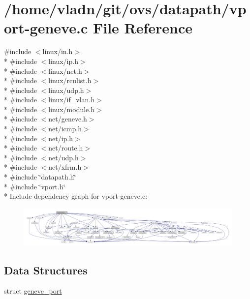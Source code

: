 \hypertarget{vport-geneve_8c}{}\section{/home/vladn/git/ovs/datapath/vport-\/geneve.c File Reference}
\label{vport-geneve_8c}
{\ttfamily \#include $<$linux/in.\+h$>$}\\*
{\ttfamily \#include $<$linux/ip.\+h$>$}\\*
{\ttfamily \#include $<$linux/net.\+h$>$}\\*
{\ttfamily \#include $<$linux/rculist.\+h$>$}\\*
{\ttfamily \#include $<$linux/udp.\+h$>$}\\*
{\ttfamily \#include $<$linux/if\+\_\+vlan.\+h$>$}\\*
{\ttfamily \#include $<$linux/module.\+h$>$}\\*
{\ttfamily \#include $<$net/geneve.\+h$>$}\\*
{\ttfamily \#include $<$net/icmp.\+h$>$}\\*
{\ttfamily \#include $<$net/ip.\+h$>$}\\*
{\ttfamily \#include $<$net/route.\+h$>$}\\*
{\ttfamily \#include $<$net/udp.\+h$>$}\\*
{\ttfamily \#include $<$net/xfrm.\+h$>$}\\*
{\ttfamily \#include \char`\"{}datapath.\+h\char`\"{}}\\*
{\ttfamily \#include \char`\"{}vport.\+h\char`\"{}}\\*
Include dependency graph for vport-\/geneve.c\+:
\nopagebreak
\begin{figure}[H]
\begin{center}
\leavevmode
\includegraphics[width=350pt]{vport-geneve_8c__incl}
\end{center}
\end{figure}
\subsection*{Data Structures}
\begin{DoxyCompactItemize}
\item 
struct \hyperlink{structgeneve__port}{geneve\+\_\+port}
\end{DoxyCompactItemize}
